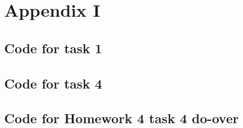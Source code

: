 \documentclass[]{article}
\begin{document}
\newpage
\section*{Appendix I}
\subsection*{Code for task 1}


\subsection*{Code for task 4}


\subsection*{Code for Homework 4 task 4 do-over}

\end{document}
